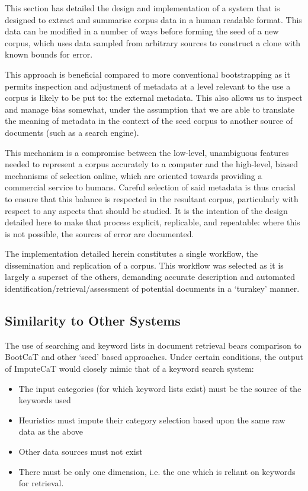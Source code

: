 

This section has detailed the design and implementation of a system that is designed to extract and summarise corpus data in a human readable format.  This data can be modified in a number of ways before forming the seed of a new corpus, which uses data sampled from arbitrary sources to construct a clone with known bounds for error.

This approach is beneficial compared to more conventional bootstrapping as it permits inspection and adjustment of metadata at a level relevant to the use a corpus is likely to be put to: the external metadata.  This also allows us to inspect and manage bias somewhat, under the assumption that we are able to translate the meaning of metadata in the context of the seed corpus to another source of documents (such as a search engine).

This mechanism is a compromise between the low-level, unambiguous features needed to represent a corpus accurately to a computer and the high-level, biased mechanisms of selection online, which are oriented towards providing a commercial service to humans.  Careful selection of said metadata is thus crucial to ensure that this balance is respected in the resultant corpus, particularly with respect to any aspects that should be studied.  It is the intention of the design detailed here to make that process explicit, replicable, and repeatable: where this is not possible, the sources of error are documented.

The implementation detailed herein constitutes a single workflow, the dissemination and replication of a corpus.  This workflow was selected as it is largely a superset of the others, demanding accurate description and automated identification/retrieval/assessment of potential documents in a `turnkey' manner.


\subsection{Similarity to Other Systems}
The use of searching and keyword lists in document retrieval bears comparison to BootCaT and other `seed' based approaches.  Under certain conditions, the output of ImputeCaT would closely mimic that of a keyword search system:

\begin{itemize}
    \item The input categories (for which keyword lists exist) must be the source of the keywords used
    \item Heuristics must impute their category selection based upon the same raw data as the above
    \item Other data sources must not exist
    \item There must be only one dimension, i.e. the one which is reliant on keywords for retrieval.
\end{itemize}

